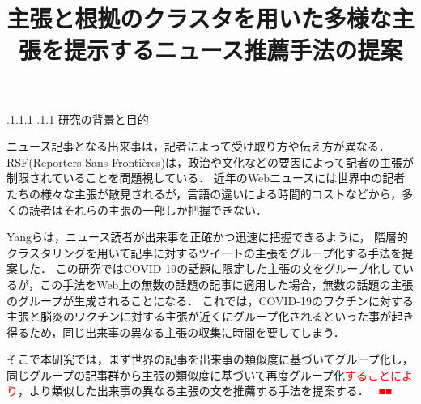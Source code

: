 \documentclass[a4paper, twocolumn, 10pt]{jarticle}
\makeatletter
\def\section{%
	\@startsection{section}{1}{\z@}%
	{.1\Cvs \@plus.1\Cdp \@minus.1\Cdp}%
	{.1\Cvs \@plus.1\Cdp}%
	{\normalfont\normalsize\bfseries}%
}
\makeatother
\begin{document}
\title{主張と根拠のクラスタを用いた多様な主張を提示するニュース推薦手法の提案}

\maketitle

\thispagestyle{empty}

\section{研究の背景と目的}

ニュース記事となる出来事は，記者によって受け取り方や伝え方が異なる．
RSF(Reporters Sans Frontières)は，政治や文化などの要因によって記者の主張が制限されていることを問題視している\cite{2021_world_press_freedom_index}．
近年のWebニュースには世界中の記者たちの様々な主張が散見されるが，言語の違いによる時間的コストなどから，多くの読者はそれらの主張の一部しか把握できない．

Yangらは，ニュース読者が出来事を正確かつ迅速に把握できるように，
階層的クラスタリングを用いて記事に対するツイートの主張をグループ化する手法を提案した\cite{yang_scalable_2021}．
この研究ではCOVID-19の話題に限定した主張の文をグループ化しているが，この手法をWeb上の無数の話題の記事に適用した場合，無数の話題の主張のグループが生成されることになる．
これでは，COVID-19のワクチンに対する主張と脳炎のワクチンに対する主張が近くにグループ化されるといった事が起き得るため，同じ出来事の異なる主張の収集に時間を要してしまう．





そこで本研究では，まず世界の記事を出来事の類似度に基づいてグループ化し，同じグループの記事群から主張の類似度に基づいて再度グループ化\textcolor{red}{することにより}，より類似した出来事の異なる主張の文を推薦する手法を提案する．
\textcolor{red}{~■■~}
\end{document}
